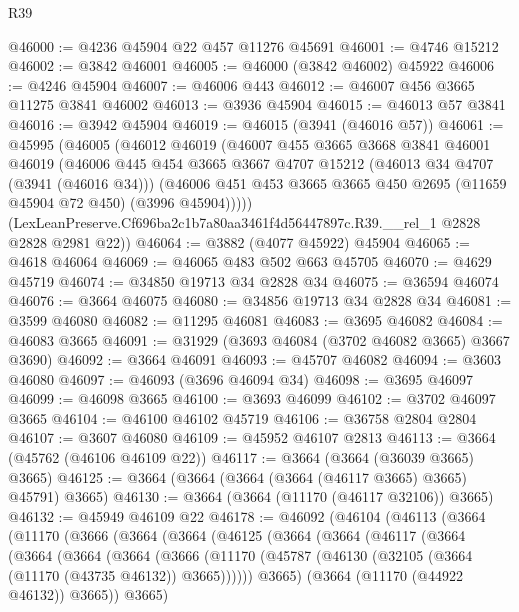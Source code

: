 \begin{lexlean}{R39}
\begin{coremodule}
@46000 := @4236 @45904 @22 @457 @11276 @45691
@46001 := @4746 @15212
@46002 := @3842 @46001
@46005 := @46000 (@3842 @46002) @45922
@46006 := @4246 @45904
@46007 := @46006 @443
@46012 := @46007 @456 @3665 @11275 @3841 @46002
@46013 := @3936 @45904
@46015 := @46013 @57 @3841
@46016 := @3942 @45904
@46019 := @46015 (@3941 (@46016 @57))
@46061 := @45995
    (@46005
      (@46012
        @46019
        (@46007
          @455
          @3665
          @3668
          @3841
          @46001
          @46019
          (@46006
            @445
            @454
            @3665
            @3667
            @4707
            @15212
            (@46013 @34 @4707 (@3941 (@46016 @34)))
            (@46006 @451 @453 @3665 @3665 @450 @2695 (@11659 @45904 @72 @450) (@3996 @45904)))))
      (LexLeanPreserve.Cf696ba2c1b7a80aa3461f4d56447897c.R39.__rel_1 @2828 @2828 @2981 @22))
@46064 := @3882 (@4077 @45922) @45904
@46065 := @4618 @46064
@46069 := @46065 @483 @502 @663 @45705
@46070 := @4629 @45719
@46074 := @34850 @19713 @34 @2828 @34
@46075 := @36594 @46074
@46076 := @3664 @46075
@46080 := @34856 @19713 @34 @2828 @34
@46081 := @3599 @46080
@46082 := @11295 @46081
@46083 := @3695 @46082
@46084 := @46083 @3665
@46091 := @31929 (@3693 @46084 (@3702 @46082 @3665) @3667 @3690)
@46092 := @3664 @46091
@46093 := @45707 @46082
@46094 := @3603 @46080
@46097 := @46093 (@3696 @46094 @34)
@46098 := @3695 @46097
@46099 := @46098 @3665
@46100 := @3693 @46099
@46102 := @3702 @46097 @3665
@46104 := @46100 @46102 @45719
@46106 := @36758 @2804 @2804
@46107 := @3607 @46080
@46109 := @45952 @46107 @2813
@46113 := @3664 (@45762 (@46106 @46109 @22))
@46117 := @3664 (@3664 (@36039 @3665) @3665)
@46125 := @3664 (@3664 (@3664 (@3664 (@46117 @3665) @3665) @45791) @3665)
@46130 := @3664 (@3664 (@11170 (@46117 @32106)) @3665)
@46132 := @45949 @46109 @22
@46178 := @46092
    (@46104
      (@46113
        (@3664
          (@11170
            (@3666
              (@3664
                (@3664
                  (@46125
                    (@3664
                      (@3664
                        (@46117
                          (@3664
                            (@3664
                              (@3664
                                (@3664
                                  (@3666
                                    (@11170
                                      (@45787
                                        (@46130 (@32105 (@3664 (@11170 (@43735 @46132)) @3665))))))
                                  @3665)
                                (@3664 (@11170 (@44922 @46132)) @3665))
                              @3665)

\end{coremodule}
\end{lexlean}
